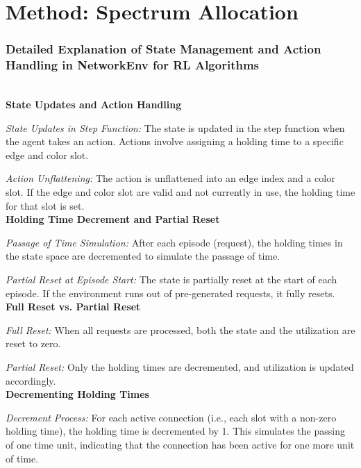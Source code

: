 \documentclass[conference]{IEEEtran}
\begin{document}
    
        

\section{\textbf{Method: Spectrum Allocation}}\hfill


\subsubsection{\textbf{Detailed Explanation of State Management and Action Handling in NetworkEnv for RL Algorithms}}\hfill\\

\noindent\textbf{State Updates and Action Handling}

 \textit{State Updates in Step Function:} The state is updated in the step function when the agent takes an action. Actions involve assigning a holding time to a specific edge and color slot.

\textit{Action Unflattening:} The action is unflattened into an edge index and a color slot. If the edge and color slot are valid and not currently in use, the holding time for that slot is set.\\

\noindent\textbf{Holding Time Decrement and Partial Reset}

\textit{Passage of Time Simulation:} After each episode (request), the holding times in the state space are decremented to simulate the passage of time.

\textit{Partial Reset at Episode Start:} The state is partially reset at the start of each episode. If the environment runs out of pre-generated requests, it fully resets.\\

\noindent\textbf{Full Reset vs. Partial Reset}

\textit{Full Reset:} When all requests are processed, both the state and the utilization are reset to zero.

\textit{Partial Reset:} Only the holding times are decremented, and utilization is updated accordingly.\\

\noindent\textbf{Decrementing Holding Times}

\textit{Decrement Process:} For each active connection (i.e., each slot with a non-zero holding time), the holding time is decremented by 1. This simulates the passing of one time unit, indicating that the connection has been active for one more unit of time.\\
\end{document}
